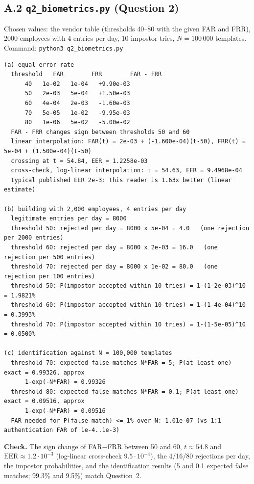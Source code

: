 \documentclass[11pt,a4paper]{article}
\begin{document}
\subsection*{A.2 \texttt{q2\_biometrics.py} (Question 2)}
Chosen values: the vendor table (thresholds 40--80 with the given FAR and FRR), 2000 employees with 4 entries per
day, 10 impostor tries, $N=100\,000$ templates. Command: \texttt{python3 q2\_biometrics.py}
\begin{Verbatim}[fontsize=\footnotesize, frame=single]
(a) equal error rate
  threshold   FAR        FRR        FAR - FRR
      40   1e-02   1e-04   +9.90e-03
      50   2e-03   5e-04   +1.50e-03
      60   4e-04   2e-03   -1.60e-03
      70   5e-05   1e-02   -9.95e-03
      80   1e-06   5e-02   -5.00e-02
  FAR - FRR changes sign between thresholds 50 and 60
  linear interpolation: FAR(t) = 2e-03 + (-1.600e-04)(t-50), FRR(t) = 5e-04 + (1.500e-04)(t-50)
  crossing at t = 54.84, EER = 1.2258e-03
  cross-check, log-linear interpolation: t = 54.63, EER = 9.4968e-04
  typical published EER 2e-3: this reader is 1.63x better (linear estimate)

(b) building with 2,000 employees, 4 entries per day
  legitimate entries per day = 8000
  threshold 50: rejected per day = 8000 x 5e-04 = 4.0   (one rejection per 2000 entries)
  threshold 60: rejected per day = 8000 x 2e-03 = 16.0   (one rejection per 500 entries)
  threshold 70: rejected per day = 8000 x 1e-02 = 80.0   (one rejection per 100 entries)
  threshold 50: P(impostor accepted within 10 tries) = 1-(1-2e-03)^10 = 1.9821%
  threshold 60: P(impostor accepted within 10 tries) = 1-(1-4e-04)^10 = 0.3993%
  threshold 70: P(impostor accepted within 10 tries) = 1-(1-5e-05)^10 = 0.0500%

(c) identification against N = 100,000 templates
  threshold 70: expected false matches N*FAR = 5; P(at least one) exact = 0.99326, approx
      1-exp(-N*FAR) = 0.99326
  threshold 80: expected false matches N*FAR = 0.1; P(at least one) exact = 0.09516, approx
      1-exp(-N*FAR) = 0.09516
  FAR needed for P(false match) <= 1% over N: 1.01e-07 (vs 1:1 authentication FAR of 1e-4..1e-3)
\end{Verbatim}
\textbf{Check.} The sign change of FAR$-$FRR between 50 and 60, $t\approx54.8$ and $\mathrm{EER}\approx1.2\cdot10^{-3}$
(log-linear cross-check $9.5\cdot10^{-4}$), the 4/16/80 rejections per day, the impostor probabilities, and the
identification results (5 and 0.1 expected false matches; 99.3\% and 9.5\%) match Question~2.

\needspace{18.2cm}
\end{document}
